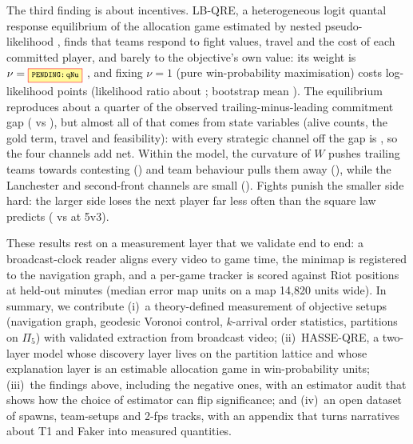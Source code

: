 The third finding is about incentives. LB-QRE, a heterogeneous logit quantal response equilibrium \citep{mckelvey1995quantal} of the allocation game estimated by nested pseudo-likelihood \citep{aguirregabiria2007sequential}, finds that teams respond to fight values, travel and the cost of each committed player, and barely to the objective's own value: its weight is $\nu=\V{qNu}$ , and fixing $\nu=1$ (pure win-probability maximisation) costs  log-likelihood points (likelihood ratio about ; bootstrap mean  ).
The equilibrium reproduces about a quarter of the observed trailing-minus-leading commitment gap ( vs \pp), but almost all of that comes from state variables (alive counts, the gold term, travel and feasibility): with every strategic channel off the gap is \pp, so the four channels add \pp{} net.
Within the model, the curvature of $W$ pushes trailing teams towards contesting (\pp) and team behaviour pulls them away (\pp), while the Lanchester and second-front channels are small ().
Fights punish the smaller side hard: the larger side loses the next player far less often than the square law predicts ( vs  at 5v3).

These results rest on a measurement layer that we validate end to end: a broadcast-clock reader aligns every video to game time, the minimap is registered to the navigation graph, and a per-game tracker is scored against Riot positions at held-out minutes (median error  map units on a map 14,820 units wide).
In summary, we contribute
(i)~a theory-defined measurement of objective setups (navigation graph, geodesic Voronoi control, $k$-arrival order statistics, partitions on $\Pi_5$) with validated extraction from broadcast video;
(ii)~HASSE-QRE, a two-layer model whose discovery layer lives on the partition lattice and whose explanation layer is an estimable allocation game in win-probability units;
(iii)~the findings above, including the negative ones, with an estimator audit that shows how the choice of estimator can flip significance; and
(iv)~an open dataset of  spawns,  team-setups and 2-fps tracks, with an appendix that turns narratives about T1 and Faker into measured quantities.
